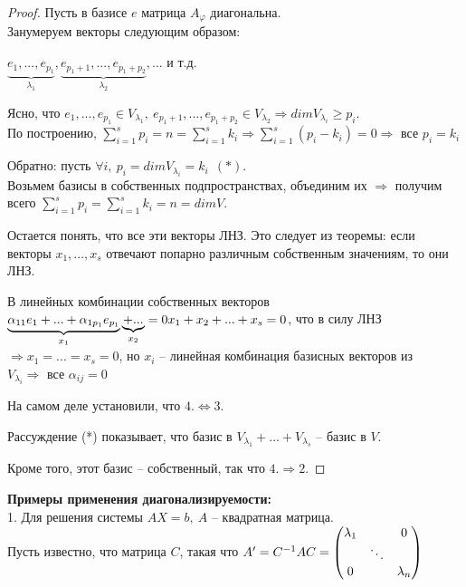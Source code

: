 \documentclass[a4paper, 12pt]{article}
\theoremstyle{definition}
\begin{document}
\begin{proof}
        Пусть в базисе $e$ матрица $A_\varphi$ диагональна.\\
        Занумеруем векторы следующим образом:

        $\underbrace{e_1,...,e_{p_1}}_{\lambda_1}, 
        \underbrace{e_{p_1 + 1},..., e_{p_1 + p_2}}_{\lambda_2},...$ и т.д. 
    
        Ясно, что $e_1,...,e_{p_1} \in V_{\lambda_1},\ 
        e_{p_1 + 1},..., e_{p_1 + p_2} \in V_{\lambda_2}
        \Longrightarrow dimV_{\lambda_i} \geq p_i$.\\
        По построению, $\sum\limits_{i=1}^{s} p_i = n =
        \sum\limits_{i=1}^{s} k_i \Longrightarrow 
        \sum\limits_{i=1}^{s} (p_i - k_i) = 0 \Longrightarrow 
        \text{ все } p_i = k_i$  
    
        Обратно: пусть $\forall i,\ p_i = dimV_{\lambda_i} = k_i\ \ (*)$.\\
        Возьмем базисы в собственных подпространствах, 
        объединим их $\Longrightarrow $ получим всего
        $\sum\limits_{i=1}^{s} p_i =
        \sum\limits_{i=1}^{s} k_i = n = dimV.$
        
        Остается понять, что все эти векторы ЛНЗ. Это 
        следует из теоремы: если векторы $x_1,...,x_s$
        отвечают попарно различным собственным значениям, 
        то они ЛНЗ. 
    
        В линейных комбинации собственных векторов $
        \underbrace{\alpha_{11}e_1+...+\alpha_{1p_1}e_{p_1}}_{x_1}
        \underbrace{+...}_{x_2} = 0\\
        x_1 + x_2 +...+ x_s = 0$, что в силу ЛНЗ $\Longrightarrow 
        x_1 = ...= x_s = 0$, но $x_i$ -- линейная комбинация
        базисных векторов из $V_{\lambda_i} \Longrightarrow
        \text{ все } \alpha_{ij} = 0$
        
        На самом деле установили, что $4. \Longleftrightarrow 3.$
        
        Рассуждение (*) показывает, что базис в $V_{\lambda_1} +
        ...+V_{\lambda_s}$ -- базис в $V$.  

        Кроме того, этот базис -- собственный, так что $4.
        \Longrightarrow 2.$ 

    \end{proof}

    \textbf{Примеры применения диагонализируемости:}\\
    1. Для решения системы $AX = b,\ A$ -- квадратная 
    матрица.\\Пусть известно, что матрица $C$, такая что
    $A' = C^{-1}AC = 
    \begin{pmatrix}
        \lambda_1 & \null & 0\\ \null & \ddots & \null\\
        0 & \null & \lambda_n
    \end{pmatrix}$
    
\end{document}
